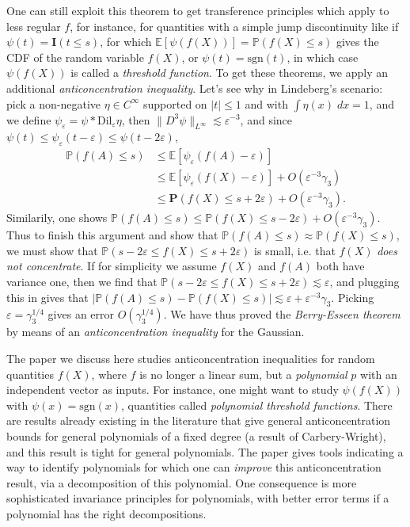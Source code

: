 \documentclass{article}
\theoremstyle{plain}
\theoremstyle{definition}
\begin{document}
One can still exploit this theorem to get transference principles which apply to less regular $f$, for instance, for quantities with a simple jump discontinuity like if $\psi(t) = \mathbf{I}(t \leq s)$, for which $\mathbb{E}[\psi(f(X))] = \mathbb{P}(f(X) \leq s)$ gives the CDF of the random variable $f(X)$, or $\psi(t) = \text{sgn}(t)$, in which case $\psi(f(X))$ is called a \emph{threshold function}. To get these theorems, we apply an additional \emph{anticoncentration inequality}. Let's see why in Lindeberg's scenario: pick a non-negative $\eta \in C^\infty$ supported on $|t| \leq 1$ and with $\int \eta(x)\; dx = 1$, and we define $\psi_\varepsilon = \psi * \text{Dil}_\varepsilon \eta$, then $\| D^3 \psi \|_{L^\infty} \lesssim \varepsilon^{-3}$, and since $\psi(t) \leq \psi_\varepsilon(t-\varepsilon) \leq \psi(t - 2\varepsilon)$,
%
\begin{align*}
    \mathbb{P}(f(A) \leq s) &\leq \mathbb{E}[\psi_\varepsilon(f(A)-\varepsilon)]\\
    &\leq \mathbb{E}[\psi_\varepsilon(f(X)-\varepsilon)] + O \left( \varepsilon^{-3} \gamma_3 \right)\\
    &\leq \mathbf{P}(f(X) \leq s + 2\varepsilon) + O(\varepsilon^{-3} \gamma_3).
\end{align*}
%
Similarily, one shows $
\mathbb{P}(f(A) \leq s) \leq \mathbb{P}(f(X) \leq s - 2\varepsilon) + O(\varepsilon^{-3} \gamma_3)$. Thus to finish this argument and show that $\mathbb{P}(f(A) \leq s) \approx \mathbb{P}(f(X) \leq s)$, we must show that $\mathbb{P}(s - 2\varepsilon \leq f(X) \leq s + 2 \varepsilon)$ is small, i.e. that $f(X)$ \emph{does not concentrate}. If for simplicity we assume $f(X)$ and $f(A)$ both have variance one, then we find that $\mathbb{P}(s - 2 \varepsilon \leq f(X) \leq s + 2 \varepsilon) \lesssim \varepsilon$, and plugging this in gives that $|\mathbb{P}(f(A) \leq s) - \mathbb{P}(f(X) \leq s)| \lesssim \varepsilon + \varepsilon^{-3} \gamma_3$. Picking $\varepsilon = \gamma_3^{1/4}$ gives an error $O(\gamma_3^{1/4})$. We have thus proved the \emph{Berry-Esseen theorem} by means of an \emph{anticoncentration inequality} for the Gaussian.

The paper \cite{Kane} we discuss here studies anticoncentration inequalities for random quantities $f(X)$, where $f$ is no longer a linear sum, but a \emph{polynomial} $p$ with an independent vector as inputs. For instance, one might want to study $\psi(f(X))$ with $\psi(x) = \text{sgn}(x)$, quantities called \emph{polynomial threshold functions}. There are results already existing in the literature that give general anticoncentration bounds for general polynomials of a fixed degree (a result of Carbery-Wright), and this result is tight for general polynomials. The paper \cite{Kane} gives tools indicating a way to identify polynomials for which one can \emph{improve} this anticoncentration result, via a decomposition of this polynomial. One consequence is more sophisticated invariance principles for polynomials, with better error terms if a polynomial has the right decompositions.
\end{document}
